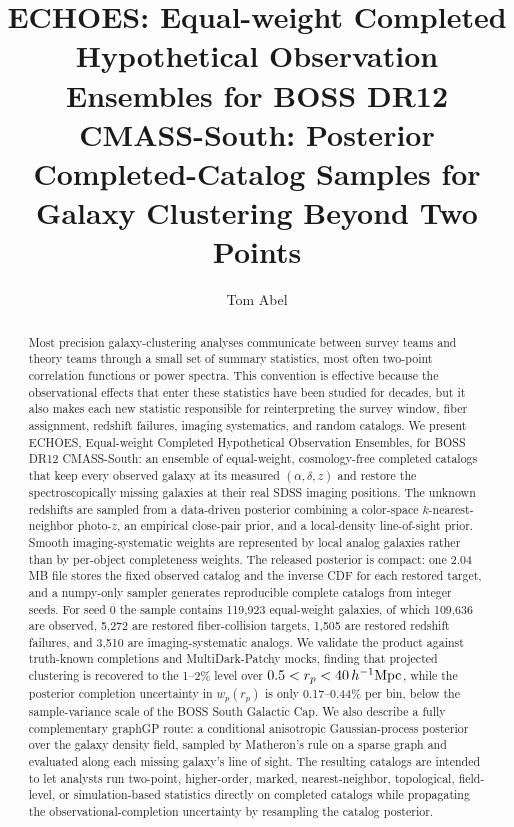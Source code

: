 \documentclass[apj]{emulateapj}
\providecommand{\correspondingauthor}[1]{}
\providecommand{\email}[1]{}
\begin{document}
\title{\textsc{ECHOES}: Equal-weight Completed Hypothetical Observation Ensembles
for BOSS DR12 CMASS-South:
Posterior Completed-Catalog Samples for Galaxy Clustering Beyond Two Points}

\author{Tom Abel}
\correspondingauthor{Tom Abel}
\email{tabel@stanford.edu}

\begin{abstract}
Most precision galaxy-clustering analyses communicate between survey teams and
theory teams through a small set of summary statistics, most often two-point
correlation functions or power spectra.  This convention is effective because the
observational effects that enter these statistics have been studied for decades,
but it also makes each new statistic responsible for reinterpreting the survey
window, fiber assignment, redshift failures, imaging systematics, and random
catalogs.  We present \textsc{ECHOES}, Equal-weight Completed Hypothetical
Observation Ensembles, for BOSS DR12 CMASS-South: an ensemble of equal-weight,
cosmology-free completed catalogs that keep every
observed galaxy at its measured $(\alpha,\delta,z)$ and restore the
spectroscopically missing galaxies at their real SDSS imaging positions.  The
unknown redshifts are sampled from a data-driven posterior combining a
color-space $k$-nearest-neighbor photo-$z$, an empirical close-pair prior, and a
local-density line-of-sight prior.  Smooth imaging-systematic weights are
represented by local analog galaxies rather than by per-object completeness
weights.  The released posterior is compact: one 2.04 MB file stores the fixed
observed catalog and the inverse CDF for each restored target, and a
numpy-only sampler generates reproducible complete catalogs from integer seeds.
For seed 0 the sample contains 119,923 equal-weight galaxies, of which 109,636
are observed, 5,272 are restored fiber-collision targets, 1,505 are restored
redshift failures, and 3,510 are imaging-systematic analogs.  We validate the
product against truth-known completions and MultiDark-Patchy mocks, finding
that projected clustering is recovered to the 1--2\% level over
$0.5<r_p<40\,h^{-1}{\rm Mpc}$, while the posterior completion uncertainty in
$w_p(r_p)$ is only 0.17--0.44\% per bin, below the sample-variance scale of the
BOSS South Galactic Cap.  We also describe a fully complementary graphGP route:
a conditional anisotropic Gaussian-process posterior over the galaxy density
field, sampled by Matheron's rule on a sparse graph and evaluated along each
missing galaxy's line of sight.  The resulting catalogs are intended to let
analysts run two-point, higher-order, marked, nearest-neighbor, topological,
field-level, or simulation-based statistics directly on completed catalogs while
propagating the observational-completion uncertainty by resampling the catalog
posterior.
\end{abstract}
\end{document}
